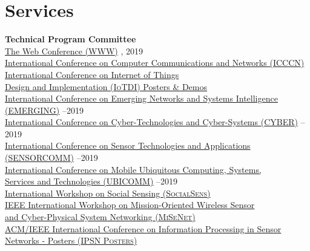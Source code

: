 
\section{\sc Services}
{\bf Technical Program Committee}\\
{\href{https://www2019.thewebconf.org/}{The Web Conference (\textsc{WWW})}} , 2019\\
{\href{http://www.icccn.org//}{International Conference on Computer Communications and Networks (\textsc{ICCCN})}} \\
{\href{http://conferences.computer.org/iotDI/2019/}{International Conference on Internet of Things \\\mbox{\hspace{0.6cm}} Design and Implementation (\textsc{IoTDI}) Posters \& Demos}} \\
{\href{http://www.iaria.org/conferences2019/EMERGING19.html}{International Conference on Emerging Networks and Systems Intelligence \\\mbox{\hspace{0.6cm}} (\textsc{EMERGING})}} --2019\\
{\href{http://www.iaria.org/conferences2019/CYBER19.html}{International Conference on Cyber-Technologies and Cyber-Systems (\textsc{CYBER})}} --2019\\
{\href{http://www.iaria.org/conferences2019/SENSORCOMM19.html}{International Conference on Sensor Technologies and Applications \\\mbox{\hspace{0.6cm}} (\textsc{SENSORCOMM})}} --2019\\
{\href{http://www.iaria.org/conferences2019/UBICOMM18.html}{International Conference on Mobile Ubiquitous Computing, Systems,\\\mbox{\hspace{0.6cm}} Services and Technologies (\textsc{UBICOMM})}} --2019\\
{\href{https://www.cse.buffalo.edu/~lusu/SocialSens2018/}{International Workshop on Social Sensing (\textsc{SocialSens})}} \\
{\href{http://infocom2018.ieee-infocom.org/content/workshop-misenet-mission-oriented-wireless-sensor-networking}{IEEE International Workshop on Mission-Oriented Wireless Sensor \\\mbox{\hspace{0.6cm}} and Cyber-Physical System Networking (\textsc{MiSeNet})}} \\
{\href{http://ipsn.acm.org/2016/posters.html}{ACM/IEEE International Conference on Information Processing in Sensor\\\mbox{\hspace{0.6cm}} Networks - Posters (\textsc{IPSN Posters})}} \\
\vspace{-0.6cm}

